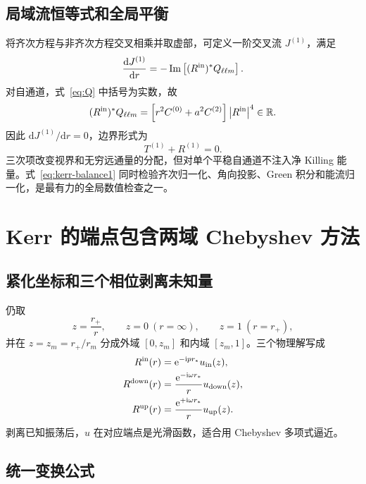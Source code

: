 \documentclass[UTF8,fontset=fandol,11pt,a4paper,oneside]{ctexart}
\numberwithin{equation}{section}
\newcommand{\dd}{\mathrm d}
\newcommand{\ii}{\mathrm i}
\newcommand{\ee}{\mathrm e}
\newcommand{\abs}[1]{\left|#1\right|}
\newcommand{\Imm}{\operatorname{Im}}
\begin{document}
\subsection{局域流恒等式和全局平衡}

将齐次方程与非齐次方程交叉相乘并取虚部，可定义一阶交叉流 $J^{(1)}$，满足
\begin{equation}
\frac{\dd J^{(1)}}{\dd r}
=-\Imm\left[(R^{\rm in})^*Q_{\ell\ell m}\right].
\label{eq:cross-current}
\end{equation}
对自通道，式~\eqref{eq:Q} 中括号为实数，故
\begin{equation}
(R^{\rm in})^*Q_{\ell\ell m}
=\left[r^2C^{(0)}+a^2C^{(2)}\right]\abs{R^{\rm in}}^4
\in\mathbb R.
\end{equation}
因此 $\dd J^{(1)}/\dd r=0$，边界形式为
\begin{equation}
\boxed{T^{(1)}+R^{(1)}=0.}
\label{eq:kerr-balance1}
\end{equation}
三次项改变视界和无穷远通量的分配，但对单个平稳自通道不注入净 Killing 能量。式~\eqref{eq:kerr-balance1} 同时检验齐次归一化、角向投影、Green 积分和能流归一化，是最有力的全局数值检查之一。

\section{Kerr 的端点包含两域 Chebyshev 方法}
\label{sec:kerr-spectral}

\subsection{紧化坐标和三个相位剥离未知量}

仍取
\begin{equation}
z=\frac{r_+}{r},\qquad z=0\ (r=\infty),\qquad z=1\ (r=r_+),
\label{eq:kerr-z}
\end{equation}
并在 $z=z_m=r_+/r_m$ 分成外域 $[0,\allowbreak z_m]$ 和内域 $[z_m,\allowbreak 1]$。三个物理解写成
\begin{align}
R^{\rm in}(r)&=\ee^{-\ii p r_*}u_{\rm in}(z),\\
R^{\rm down}(r)&=\frac{\ee^{-\ii\omega r_*}}{r}u_{\rm down}(z),\\
R^{\rm up}(r)&=\frac{\ee^{+\ii\omega r_*}}{r}u_{\rm up}(z).
\label{eq:kerr-peeling}
\end{align}
剥离已知振荡后，$u$ 在对应端点是光滑函数，适合用 Chebyshev 多项式逼近。

\subsection{统一变换公式}
\end{document}
